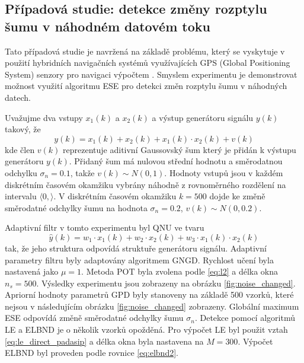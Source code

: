 \subsection{Případová studie: detekce změny rozptylu šumu v náhodném datovém toku}
Tato případová studie je navržená na základě problému, který se vyskytuje v použití hybridních navigačních systémů využívajících GPS (Global Positioning System) senzory pro navigaci výpočtem \cite{dead}. Smyslem experimentu je demonstrovat možnost využití algoritmu ESE pro detekci změn rozptylu šumu v náhodných datech.
\par
Uvažujme dva vstupy $x_1(k)$ a $x_2(k)$ a výstup generátoru signálu $y(k)$ takový, že
\begin{equation}
y(k)=x_1(k)+x_2(k)+x_1(k)\cdot x_2(k)+v(k)
\end{equation}
kde člen $v(k)$ reprezentuje aditivní Gaussovský šum který je přidán k výstupu generátoru $y(k)$. Přidaný šum má nulovou střední hodnotu a směrodatnou odchylku $\sigma_n=0.1$, takže $v(k)\sim N(0,1)$. Hodnoty vstupů jsou v každém diskrétním časovém okamžiku vybrány náhodně z rovnoměrného rozdělení na intervalu $\langle 0,\rangle$. V diskrétním časovém okamžiku $k=500$ dojde ke změně směrodatné odchylky šumu na hodnota $\sigma_n=0.2$, $v(k) \sim N(0,0.2)$.
\par 
Adaptivní filtr v tomto experimentu byl QNU ve tvaru
\begin{equation}
\hat{y}(k)=w_1\cdot x_1(k) + w_2\cdot x_2(k)+w_3\cdot x_1(k)\cdot x_2(k)
\end{equation}
tak,  že jeho struktura odpovídá struktuře generátoru signálu. Adaptivní parametry filtru byly adaptovány algoritmem GNGD. Rychlost učení byla nastavená jako $\mu=1$. Metoda POT byla zvolena podle \ref{eq:l2} a délka okna $n_s=500$. Výsledky experimentu jsou zobrazeny na obrázku \ref{fig:noise_changed}. Apriorní hodnoty parametrů GPD byly stanoveny na základě 500 vzorků, které nejsou v následujícím obrázku \ref{fig:noise_changed} zobrazeny. Globální maximum ESE odpovídá změně směrodatné odchylky šumu $\sigma_n$. Detekce pomocí algoritmů LE a ELBND je o několik vzorků opožděná. Pro výpočet LE byl použit vztah \ref{eq:le_direct_padasip} a délka okna byla nastavena na $M=300$. Výpočet ELBND byl proveden podle rovnice \ref{eq:elbnd2}.

